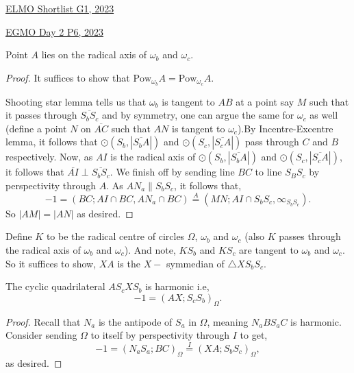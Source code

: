 \begin{problem}{14}{\href{https://artofproblemsolving.com/community/c6h3100572p28033718}{ELMO Shortlist G1, 2023}}
\begin{problem}{1}{\href{https://artofproblemsolving.com/community/c6h3054399p27522960}{EGMO Day 2 P6, 2023}}
\begin{solution}
	\begin{claim}
	Point $A$ lies on the radical axis of $\omega_b$ and $\omega_c$.
	\end{claim}
	\begin{proof} It suffices to show that $\text{Pow}_{\omega_b}A=\text{Pow}_{\omega_c}A$.
	\par Shooting star lemma tells us that $\omega_b$ is tangent to $AB$ at a point say $M$ such that it passes through $\overline{S_bS_c}$ and by symmetry, one can argue the same for $\omega_c$ as well (define a point $N$ on $\overline{AC}$ such that $AN$ is tangent to $\omega_c$).By Incentre-Excentre lemma, it follows that $\odot (S_b, |\overline{S_bA}|)$ and $\odot (S_c, |\overline{S_cA}|)$ pass through $C$ and $B$ respectively. Now, as $AI$ is the radical axis of $\odot (S_b, |\overline{S_bA}|)$ and $\odot (S_c, |\overline{S_cA}|)$, it follows that $\overline{AI}\perp\overline{S_bS_c}$. We finish off by sending line $BC$ to line $S_BS_c$ by perspectivity through $A$. As $AN_a\parallel S_bS_c$, it follows that,
	$$-1=(BC; AI\cap BC,AN_a\cap BC)\overset{A}{=}(MN; AI\cap S_bS_c,\infty_{S_bS_c}).$$
	So $|AM|=|AN|$ as desired.
	\end{proof}
	
	Define $K$ to be the radical centre of circles $\Omega$, $\omega_b$ and $\omega_c$ (also $K$ passes through the radical axis of $\omega_b$ and $\omega_c$). And note, $KS_b$ and $KS_c$ are tangent to $\omega_b$ and $\omega_c$. So it suffices to show, $XA$ is the $X-$ symmedian of $\triangle XS_bS_c$.
	\begin{claim}
		The cyclic quadrilateral $AS_cXS_b$ is harmonic i.e,
		$$-1=(AX;S_cS_b)_{\Omega}.$$
	\end{claim}
	\begin{proof} Recall that $N_a$ is the antipode of $S_a$ in $\Omega$, meaning $N_aBS_aC$ is harmonic. Consider sending $\Omega$ to itself by perspectivity through $I$ to get,
	$$-1=(N_aS_a;BC)_{\Omega}\overset{I}{=}(XA;S_bS_c)_{\Omega},$$
	as desired.
	\end{proof}


\end{solution}
\end{problem}
\end{problem}
